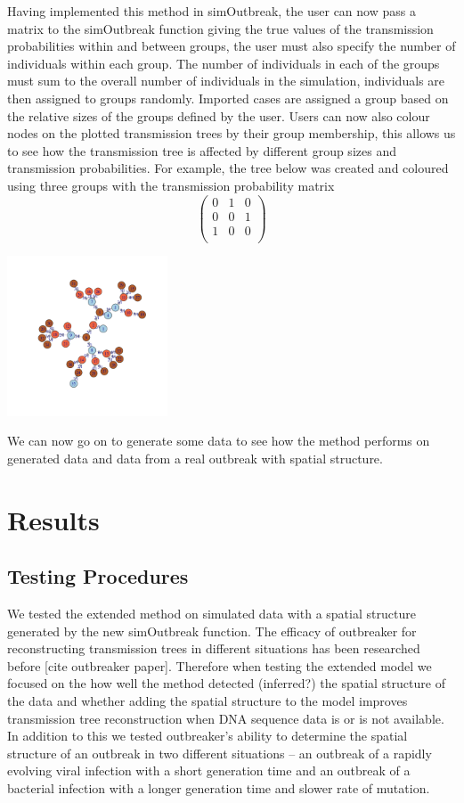 \documentclass[11pt,a4paper]{report}
\begin{document}
Having implemented this method in simOutbreak, the user can now pass a matrix to the simOutbreak function giving the true values of the transmission probabilities within and between groups, the user must also specify the number of individuals within each group. The number of individuals in each of the groups must sum to the overall number of individuals in the simulation, individuals are then assigned to groups randomly. Imported cases are assigned a group based on the relative sizes of the groups defined by the user. Users can now also colour nodes on the plotted transmission trees by their group membership, this allows us to see how the transmission tree is affected by different group sizes and transmission probabilities. For example, the tree below was created and coloured using three groups with the transmission probability matrix
\[ \left( \begin{array}{ccc}
0 & 1 & 0 \\
0 & 0 & 1 \\
1 & 0 & 0 \\
\end{array} \right) \]
\begin{center}
\includegraphics[width=180px]{treexample.png}
\end{center}
We can now go on to generate some data to see how the method performs on generated data and data from a real outbreak with spatial structure.

\chapter{Results}
\section{Testing Procedures}
We tested the extended method on simulated data with a spatial structure generated by the new simOutbreak function. The efficacy of outbreaker for reconstructing transmission trees in different situations has been researched before [cite outbreaker paper]. Therefore when testing the extended model we focused on the how well the method detected (inferred?) the spatial structure of the data and whether adding the spatial structure to the model improves transmission tree reconstruction when DNA sequence data is or is not available. In addition to this we tested outbreaker’s ability to determine the spatial structure of an outbreak in two different situations – an outbreak of a rapidly evolving viral infection with a short generation time and an outbreak of a bacterial infection with a longer generation time and slower rate of mutation. 
\end{document}
